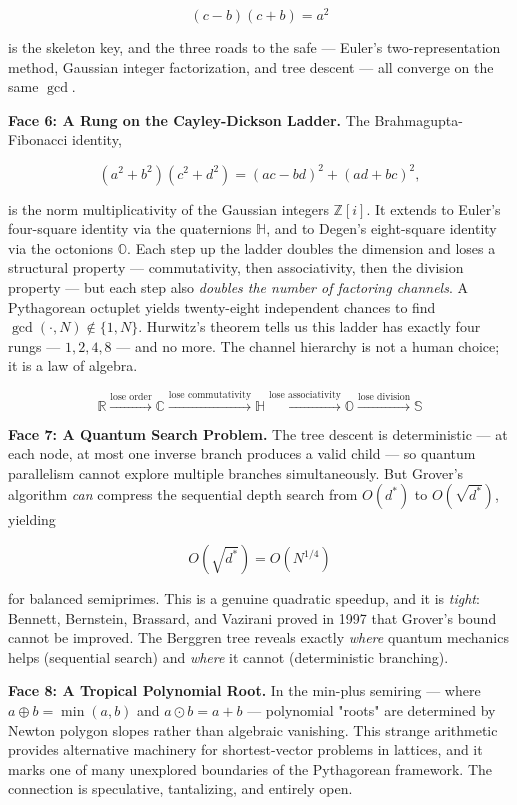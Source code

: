 \documentclass[11pt,twoside,openright]{book}
\theoremstyle{definition}
\theoremstyle{remark}
\begin{document}
\[(c - b)(c + b) = a^2\]

is the skeleton key, and the three roads to the safe --- Euler's two-representation method, Gaussian integer factorization, and tree descent --- all converge on the same $\gcd$.

\textbf{Face 6: A Rung on the Cayley-Dickson Ladder.} The Brahmagupta-Fibonacci identity,

\[(a^2 + b^2)(c^2 + d^2) = (ac - bd)^2 + (ad + bc)^2,\]

is the norm multiplicativity of the Gaussian integers $\mathbb{Z}[i]$. It extends to Euler's four-square identity via the quaternions $\mathbb{H}$, and to Degen's eight-square identity via the octonions $\mathbb{O}$. Each step up the ladder doubles the dimension and loses a structural property --- commutativity, then associativity, then the division property --- but each step also \textit{doubles the number of factoring channels}. A Pythagorean octuplet yields twenty-eight independent chances to find $\gcd(\cdot, N) \notin \{1, N\}$. Hurwitz's theorem tells us this ladder has exactly four rungs --- $1, 2, 4, 8$ --- and no more. The channel hierarchy is not a human choice; it is a law of algebra.

\[\mathbb{R} \xrightarrow{\text{lose order}} \mathbb{C} \xrightarrow{\text{lose commutativity}} \mathbb{H} \xrightarrow{\text{lose associativity}} \mathbb{O} \xrightarrow{\text{lose division}} \mathbb{S}\]

\textbf{Face 7: A Quantum Search Problem.} The tree descent is deterministic --- at each node, at most one inverse branch produces a valid child --- so quantum parallelism cannot explore multiple branches simultaneously. But Grover's algorithm \textit{can} compress the sequential depth search from $O(d^*)$ to $O(\sqrt{d^*})$, yielding

\[O(\sqrt{d^*}) = O(N^{1/4})\]

for balanced semiprimes. This is a genuine quadratic speedup, and it is \textit{tight}: Bennett, Bernstein, Brassard, and Vazirani proved in 1997 that Grover's bound cannot be improved. The Berggren tree reveals exactly \textit{where} quantum mechanics helps (sequential search) and \textit{where} it cannot (deterministic branching).

\textbf{Face 8: A Tropical Polynomial Root.} In the min-plus semiring --- where $a \oplus b = \min(a,b)$ and $a \odot b = a + b$ --- polynomial "roots" are determined by Newton polygon slopes rather than algebraic vanishing. This strange arithmetic provides alternative machinery for shortest-vector problems in lattices, and it marks one of many unexplored boundaries of the Pythagorean framework. The connection is speculative, tantalizing, and entirely open.
\end{document}
